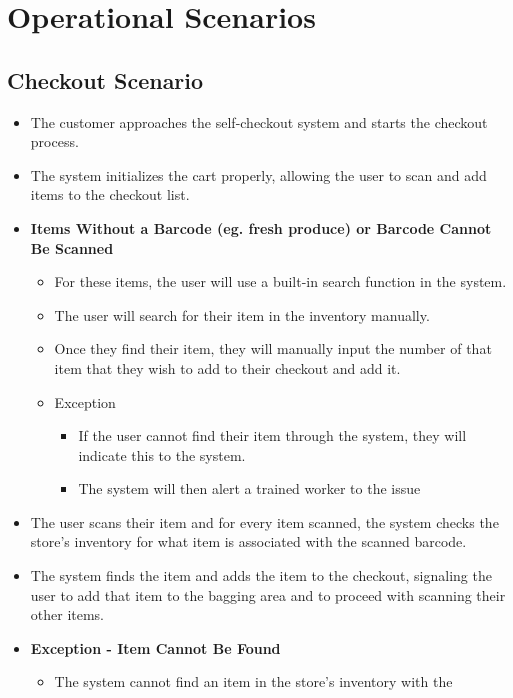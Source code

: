 \section{Operational Scenarios}

\subsection{Checkout Scenario}
\begin{itemize}
	\item The customer approaches the self-checkout system and starts 
    the checkout process.
	\item The system initializes the cart properly, allowing the user to 
    scan and add items to the checkout list.
    \item \textbf{Items Without a Barcode (eg. fresh produce) or 
    Barcode Cannot Be Scanned}
    \begin{itemize}
        \item For these items, the user will use a built-in search 
        function in the system.
        \item The user will search for their item in the inventory manually.
        \item Once they find their item, they will manually input the number 
        of that item that they wish to add to their checkout and add it.
        \item Exception
        \begin{itemize}
            \item If the user cannot find their item through the system, 
            they will indicate this to the system.
            \item The system will then alert a trained worker to the issue
        \end{itemize}
    \end{itemize}
    \item The user scans their item and for every item scanned, the system 
    checks the store’s inventory for what item is associated with 
    the scanned barcode.
    \item The system finds the item and adds the item to the checkout, 
    signaling the user to add that item to the bagging area and to proceed
    with scanning their other items.
    \item \textbf{Exception - Item Cannot Be Found}
    \begin{itemize}
        \item The system cannot find an item in the store’s inventory with the 

\end{itemize}
\end{itemize}
